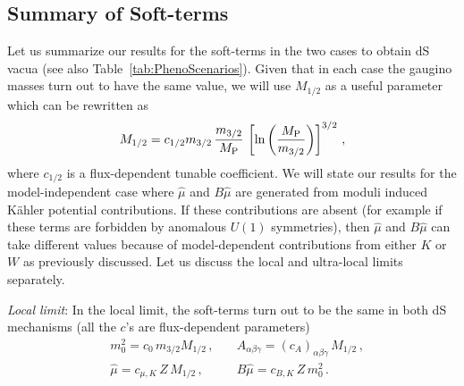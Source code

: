 \documentclass[12pt,a4paper]{book}
\def\nn{\nonumber}
\def\nn{\nonumber}
\begin{document}
\subsection{Summary of Soft-terms}

Let us summarize our results for the soft-terms in the two cases to obtain dS vacua (see also Table~\ref{tab:PhenoScenarios}). Given that in each case the gaugino masses turn out to have the same value, we will use $M_{1/2}$ as a useful parameter which can be rewritten as
\begin{align}
M_{1/2} = c_{1/2} m_{3/2}\,\frac{m_{3/2}}{M_{\rm P}}\, \left[ \ln\left(\frac{M_{\rm P}}{m_{3/2}}\right)\right]^{3/2}\, ,
\end{align}
where $c_{1/2}$ is a flux-dependent tunable coefficient. We will state our results for the model-independent case where $\hat\mu$ and $B\hat\mu$ are generated from moduli induced K\"ahler potential contributions. If these contributions are absent (for example if these terms are forbidden by anomalous $U(1)$ symmetries), then $\hat\mu$ and $B\hat\mu$ can take different values because of model-dependent contributions from either $K$ or $W$ as previously discussed. Let us discuss the local and ultra-local limits separately.

\medskip
\emph{Local limit}: In the local limit, the soft-terms turn out to be the same in both dS mechanisms (all the $c$'s are flux-dependent parameters)
\begin{align}
\label{eq:SummarySoftLocal}
&m_0^2 = c_0\,m_{3/2} M_{1/2}\,,\quad &A_{\alpha\beta\gamma} = (c_A)_{\alpha\beta\gamma}\,M_{1/2}\,, \nn \\
&\hat\mu= c_{\mu,K}\,Z\,M_{1/2}\,,\quad &B\hat\mu = c_{B,K}\,Z\,m_0^2\,.
\end{align}
\end{document}
